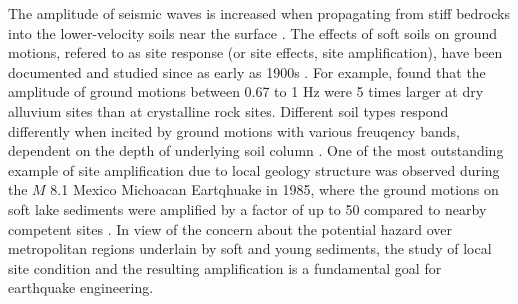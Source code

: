 The amplitude of seismic waves is increased when propagating from stiff bedrocks into the lower-velocity soils near the surface \citep{booreShortperiodSwaveRadiation1986,silvaEngineeringCharacterizationStrong1995}. The effects of soft soils on ground motions, refered to as site response (or site effects, site amplification), have been documented and studied since as early as 1900s . For example, \citet{gutenbergEffectsGroundEarthquake1957} found that the amplitude of ground motions between 0.67 to 1 Hz were 5 times larger at dry alluvium sites than at crystalline rock sites.  Different soil types respond differently when incited by ground motions with various freuqency bands, dependent on the depth of underlying soil column \citep{akiLocalSiteEffects1993}. One of the most outstanding example of site amplification due to local geology structure was observed during the $M$ 8.1 Mexico Michoacan Eartqhuake in 1985, where the ground motions on soft lake sediments were amplified by a factor of up to 50 compared to nearby competent sites \citep{singh1993origin}. In view of the concern about the potential hazard over metropolitan regions underlain by soft and young sediments, the study of local site condition and the resulting amplification is a fundamental goal for earthquake engineering.

